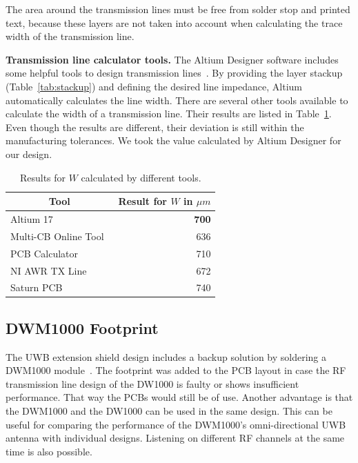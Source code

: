 \documentclass[journal,comsoc]{IEEEtran}
\begin{document}
The area around the transmission lines must be free from solder stop and printed text, because these layers are not taken into account when calculating the trace width of the transmission line.

\vspace*{0.5em}
\noindent\textbf{Transmission line calculator tools.} The Altium Designer software includes some helpful tools to design transmission lines~\cite{altiumwebsite}.
By providing the layer stackup (Table~\ref{tab:stackup}) and defining the desired line impedance, Altium automatically calculates the line width.
There are several other tools available to calculate the width of a transmission line.
Their results are listed in Table~\ref{tab:txlinecalculations}.
Even though the results are different, their deviation is still within the manufacturing tolerances.
We took the value calculated by Altium Designer for our design.
\begin{table}[h!]
	\centering
	\begin{tabular}{lr}
	\multicolumn{1}{c}{Tool} & \multicolumn{1}{c}{Result for $W$ in $\mu m$} \\ \hline
	Altium 17~\cite{altiumwebsite} & \textbf{700} \\
	Multi-CB Online Tool~\cite{mcbwebsite} & 636 \\
	PCB Calculator~\cite{kicadwebsite} & 710 \\
	NI AWR TX Line~\cite{nitxlinewebsite} & 672 \\
	Saturn PCB~\cite{saturnwebsite} & 740 \\
	\end{tabular}
	\caption{Results for $W$ calculated by different tools.}
	\label{tab:txlinecalculations}
\end{table}

\subsection{DWM1000 Footprint}
\label{subsec:dwm1000footprint}
The UWB extension shield design includes a backup solution by soldering a DWM1000 module~\cite{dwm1000ds}.
The footprint was added to the PCB layout in case the RF transmission line design of the DW1000 is faulty or shows insufficient performance.
That way the PCBs would still be of use. 
Another advantage is that the DWM1000 and the DW1000 can be used in the same design.
This can be useful for comparing the performance of the DWM1000's omni-directional UWB antenna with individual designs.
Listening on different RF channels at the same time is also possible.
\end{document}
